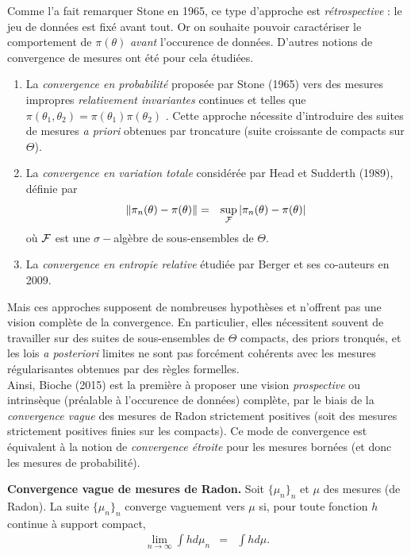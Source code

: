 Comme l'a fait remarquer Stone en 1965, ce type d'approche est \emph{rétrospective} : le jeu de données est fixé avant tout. Or on souhaite pouvoir caractériser le comportement de $\pi(\theta)$ \emph{avant} l'occurence de données. D'autres notions de convergence de mesures ont été pour cela étudiées.
\begin{enumerate}
\item La \emph{convergence en probabilité} proposée par Stone (1965) vers des mesures impropres {\it relativement invariantes}   continues et  
telles que $\pi(\theta_1,\theta_2) = \pi(\theta_1)\pi(\theta_2)$ . Cette approche nécessite d'introduire des suites de mesures {\it a priori} obtenues par troncature (suite croissante de compacts sur $\Theta$).
 \item La \emph{convergence en variation totale} considérée par Head et Sudderth (1989), définie par
\begin{eqnarray*}
\| \pi_n(\theta) - \pi(\theta) \| & = & \sup\limits_{{\cal{F}}} | \pi_n(\theta) - \pi(\theta) |
\end{eqnarray*}  
où ${\cal{F}}$ est une $\sigma-$algèbre de sous-ensembles de $\Theta$.
\item La \emph{convergence en entropie relative} étudiée par Berger et ses co-auteurs en 2009. \\
\end{enumerate}
Mais ces approches supposent de nombreuses hypothèses et n'offrent pas une vision complète de la convergence. En particulier, elles nécessitent souvent de travailler sur des suites de sous-ensembles de $\Theta$ compacts, des priors tronqués, et les lois {\it a posteriori} limites ne sont pas forcément cohérents avec les mesures régularisantes obtenues par des règles formelles. \\

Ainsi, Bioche (2015) est la première à proposer une vision {\it prospective} ou intrinsèque (préalable à l'occurence de données) complète, par le biais de la \emph{convergence vague} des mesures de Radon strictement positives (soit des mesures strictement positives finies sur les compacts). Ce mode de convergence est équivalent à la notion de \emph{convergence étroite} pour les mesures bornées (et donc les mesures de probabilité).

\begin{definition}{\bf Convergence vague de mesures de Radon.}
Soit $\{\mu_n\}_n$  et $\mu$ des mesures (de Radon). La suite $\{\mu_n\}_n$ converge
vaguement vers $\mu$ si,  pour toute fonction $h$ continue à support compact, 
\begin{eqnarray*}
\lim\limits_{n\to\infty} \int h d\mu_n & = & \int h d\mu.
\end{eqnarray*}
\end{definition}

